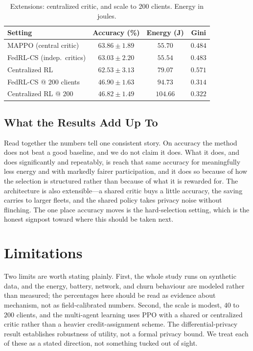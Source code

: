 \documentclass[conference]{IEEEtran}
\begin{document}
\begin{table}[t]
\caption{Extensions: centralized critic, and scale to $200$ clients. Energy in
joules.}
\label{tab:ext}
\centering
\begin{tabular}{lccc}
\toprule
Setting & Accuracy (\%) & Energy (J) & Gini \\
\midrule
MAPPO (central critic) & $63.86\pm1.89$ & $55.70$ & $0.484$ \\
FedRL-CS (indep.\ critics) & $63.03\pm2.20$ & $55.54$ & $0.483$ \\
Centralized RL & $62.53\pm3.13$ & $79.07$ & $0.571$ \\
\midrule
FedRL-CS @ $200$ clients & $46.90\pm1.63$ & $94.73$ & $0.314$ \\
Centralized RL @ $200$ & $46.82\pm1.49$ & $104.66$ & $0.322$ \\
\bottomrule
\end{tabular}
\end{table}

\subsection{What the Results Add Up To}
Read together the numbers tell one consistent story. On accuracy the method does
not beat a good baseline, and we do not claim it does. What it does, and does
significantly and repeatably, is reach that same accuracy for meaningfully less
energy and with markedly fairer participation, and it does so because of how the
selection is structured rather than because of what it is rewarded for. The
architecture is also extensible---a shared critic buys a little accuracy, the
saving carries to larger fleets, and the shared policy takes privacy noise without
flinching. The one place accuracy moves is the hard-selection setting, which is
the honest signpost toward where this should be taken next.

\section{Limitations}
\label{sec:limits}
Two limits are worth stating plainly. First, the whole study runs on synthetic
data, and the energy, battery, network, and churn behaviour are modeled rather
than measured; the percentages here should be read as evidence about mechanism,
not as field-calibrated numbers. Second, the scale is modest, $40$ to $200$
clients, and the multi-agent learning uses PPO with a shared or centralized critic
rather than a heavier credit-assignment scheme. The differential-privacy result
establishes robustness of utility, not a formal privacy bound. We treat each of
these as a stated direction, not something tucked out of sight.
\end{document}
